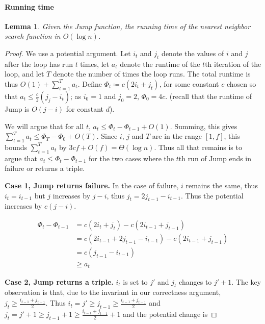 \documentclass[10pt,a4paper]{amsart}
\newcommand{\yakov}[1]{\textcolor{blue}{Yakov: #1}}
\newtheorem{lemma}{Lemma}
\begin{document}
\paragraph*{Running time} 
\begin{lemma}
  \label{lemma:querytime}
Given the Jump function, the running time of the nearest neighbor search function in $O(\log n)$.
\end{lemma}

\begin{proof}
We use a potential argument. Let $i_t$ and $j_t$ denote the values of $i$ and $j$ after the loop has run $t$ times, let $a_t$ denote the runtime of the $t$th iteration of the loop, and let $T$ denote the number of times the loop runs. The total runtime is thus $O(1)+\sum_{t=1}^{T} a_t$. Define $\Phi_t \coloneqq c(2i_t+j_t)$, for some constant $c$ chosen so that $a_t \leq \frac{c}{2}(j_j-i_t)$; as $i_0=1$ and $j_0=2$, $\Phi_0=4c$. (recall that the runtime of Jump is $O(j-i)$ for constant $d$). 



We will argue that for all $t$, 
$ a_t  \leq \Phi_{t}-\Phi_{t-1} + O(1)$.
Summing, this gives $\sum_{t=1}^{T} a_t \leq \Phi_{T}-\Phi_{0}+O(T)$. Since $i$, $j$ and $T$ are in the range $[1,f]$, this bounds $\sum_{t=1}^{T} a_t$ by $3cf+O(f)=\Theta(\log n)$. %
%
%
Thus all that remains is to argue that $a_t \leq \Phi_{t}-\Phi_{t-1}$ for the two cases where the $t$th run of Jump ends in failure or  returns a triple.

\noindent
\textbf{Case 1, Jump returns failure.}
In the case of failure, $i$ remains the same, thus $i_t=i_{t-1}$ but $j$ increases by $j-i$, thus $j_t=2j_{t-1}-i_{t-1}$. Thus the potential increases by $c(j-i)$.

 \begin{align*}
 \Phi_t-\Phi_{t-1}&=  c(2i_t+j_t) - c(2i_{t-1}+j_{t-1})\\
 &= c(2i_{t-1}+2j_{t-1}-i_{t-1}) - c(2i_{t-1}+j_{t-1})
\\
 &= c(j_{t-1}-i_{t-1})
\\
&\geq a_t
\end{align*}

\noindent
\textbf{Case 2, Jump returns a triple.} 
$i_{t}$ is set to $j'$ and $j_{t}$ changes to $j'+1$. 
The key observation is that, due to the invariant in our correctness argument,  $j_t \geq \frac{i_{t-1}+j_{t-1}}{2}$.
Thus $i_{t}=j'\ge j_{t-1}\geq \frac{i_{t-1}+j_{t-1}}{2}$ and $j_{t}= j'+1 \ge j_{t-1}+1\geq \frac{i_{t-1}+j_{t-1}}{2}+1$
and the potential change is


\end{proof}
\end{document}
